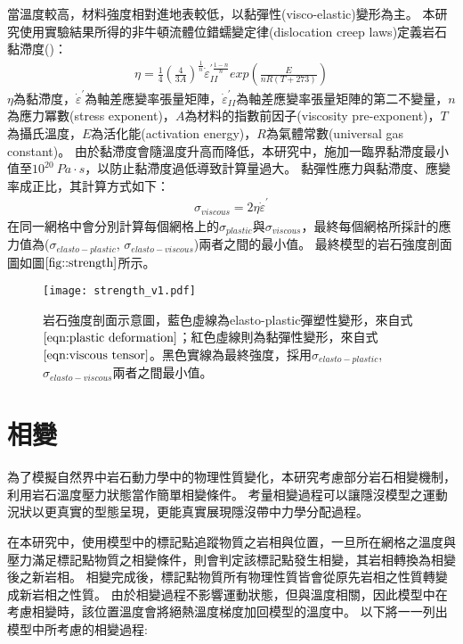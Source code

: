 當溫度較高，材料強度相對進地表較低，以黏彈性(visco-elastic)變形為主。
本研究使用實驗結果所得的非牛頓流體位錯蠕變定律(dislocation creep laws)定義岩石黏滯度(\citealp{Chen1990})：
\begin{align}
   \eta=\frac{1}{4}(\frac{4}{3A})^{\frac{1}{n}} \dot\varepsilon_{II}^{' \frac{1-n}{n}} exp(\frac{E}{nR(T+273)})
   \label{eqn:viscousity}
\end{align}
$\eta$為黏滯度，$\dot\varepsilon^{'}$為軸差應變率張量矩陣，$\dot\varepsilon_{II}^{'}$為軸差應變率張量矩陣的第二不變量，$n$為應力冪數(stress exponent)，$A$為材料的指數前因子(viscosity pre-exponent)，$T$為攝氏溫度，$E$為活化能(activation energy)，$R$為氣體常數(universal gas constant)。
由於黏滯度會隨溫度升高而降低，本研究中，施加一臨界黏滯度最小值至$10^{20}\ Pa\cdot s$，以防止黏滯度過低導致計算量過大。
黏彈性應力與黏滯度、應變率成正比，其計算方式如下：	
\begin{align}
    \sigma_{viscous} = 2\eta\dot\varepsilon^{'} \label{eqn:viscous tensor}
\end{align}
在同一網格中會分別計算每個網格上的$\sigma_{plastic}$與$\sigma_{viscous}$，最終每個網格所採計的應力值為($\sigma_{elasto-plastic}$, $\sigma_{elasto-viscous}$)兩者之間的最小值。
最終模型的岩石強度剖面圖如圖$\ref{fig::strength}$所示。
\begin{figure*}[ht!]
    \centering
    \texttt{[image: strength\_v1.pdf]}
    \caption[岩石強度剖面示意圖]{岩石強度剖面示意圖，藍色虛線為elasto-plastic彈塑性變形，來自式$\ref{eqn:plastic deformation}$；紅色虛線則為黏彈性變形，來自式$\ref{eqn:viscous tensor}$。黑色實線為最終強度，採用$\sigma_{elasto-plastic}$, $\sigma_{elasto-viscous}$兩者之間最小值。}
    \label{fig::strength}
\end{figure*}

\section{相變}\label{相變}

為了模擬自然界中岩石動力學中的物理性質變化，本研究考慮部分岩石相變機制，利用岩石溫度壓力狀態當作簡單相變條件。
考量相變過程可以讓隱沒模型之運動況狀以更真實的型態呈現，更能真實展現隱沒帶中力學分配過程。

在本研究中，使用模型中的標記點追蹤物質之岩相與位置，一旦所在網格之溫度與壓力滿足標記點物質之相變條件，則會判定該標記點發生相變，其岩相轉換為相變後之新岩相。
相變完成後，標記點物質所有物理性質皆會從原先岩相之性質轉變成新岩相之性質。
由於相變過程不影響運動狀態，但與溫度相關，因此模型中在考慮相變時，該位置溫度會將絕熱溫度梯度加回模型的溫度中。
以下將一一列出模型中所考慮的相變過程:


